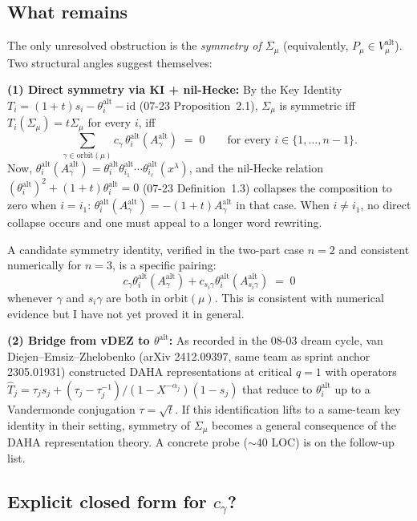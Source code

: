 \documentclass[11pt]{article}
\theoremstyle{definition}
\newcommand{\alt}{\mathrm{alt}}
\newcommand{\orbit}{\mathrm{orbit}}
\newcommand{\Sig}{\Sigma_\mu}
\begin{document}
\subsection{What remains}

The only unresolved obstruction is the \emph{symmetry of $\Sig$}
(equivalently, $P_\mu\in V_\mu^\alt$).  Two structural angles suggest
themselves:

\smallskip

\noindent\textbf{(1) Direct symmetry via KI + nil-Hecke:}  By the Key
Identity $T_i = (1+t) s_i - \theta^\alt_i - \mathrm{id}$ (07-23
Proposition~2.1), $\Sig$ is symmetric iff $T_i(\Sig) = t\Sig$ for every
$i$, iff
\[
\sum_{\gamma\in\orbit(\mu)} c_\gamma\, \theta^\alt_i(A^\alt_\gamma) \;=\; 0
\qquad \text{for every } i\in\{1,\dots,n-1\}.
\]
Now, $\theta^\alt_i(A^\alt_\gamma) = \theta^\alt_i\theta^\alt_{i_1}\cdots
\theta^\alt_{i_\ell}(x^\lambda)$, and the nil-Hecke relation
$(\theta^\alt_i)^2 + (1+t)\theta^\alt_i = 0$ (07-23 Definition~1.3)
collapses the composition to zero when $i = i_1$: $\theta^\alt_i(A^\alt_\gamma)
= -(1+t) A^\alt_\gamma$ in that case.  When $i \ne i_1$, no direct
collapse occurs and one must appeal to a longer word rewriting.

A candidate symmetry identity, verified in the two-part case $n=2$
and consistent numerically for $n=3$, is a specific pairing:
\[
c_\gamma \theta^\alt_i(A^\alt_\gamma) + c_{s_i\gamma} \theta^\alt_i(A^\alt_{s_i\gamma}) \;=\; 0
\]
whenever $\gamma$ and $s_i\gamma$ are both in $\orbit(\mu)$.  This is
consistent with numerical evidence but I have not yet proved it in
general.

\smallskip

\noindent\textbf{(2) Bridge from vDEZ to $\theta^\alt$:}  As recorded
in the 08-03 dream cycle, van Diejen--Emsiz--Zhelobenko
(arXiv 2412.09397, same team as sprint anchor 2305.01931) constructed
DAHA representations at critical $q=1$ with operators
$\widehat T_j = \tau_j s_j + (\tau_j - \tau_j^{-1})/(1 - X^{-\alpha_j})(1 - s_j)$
that reduce to $\theta^\alt_i$ up to a Vandermonde conjugation
$\tau = \sqrt{t}$.  If this identification lifts to a same-team key
identity in their setting, symmetry of $\Sig$ becomes a general
consequence of the DAHA representation theory.  A concrete probe
($\sim 40$ LOC) is on the follow-up list.

\subsection{Explicit closed form for $c_\gamma$?}
\end{document}

